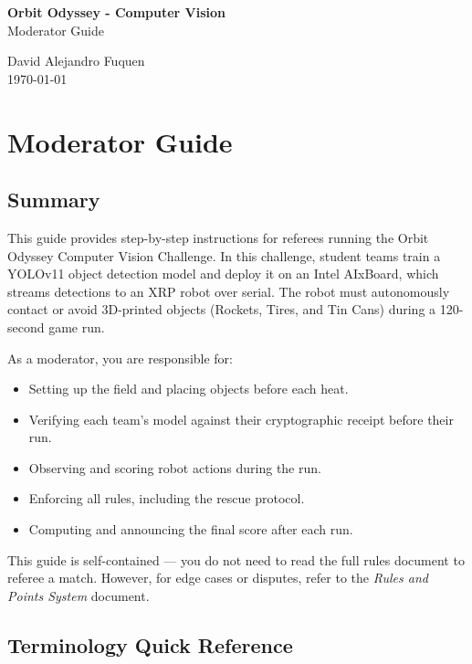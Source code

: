 \documentclass[a4]{article}
\begin{document}
    
    \thispagestyle{fancy}
    
    \begin{center}
        \textbf{\large Orbit Odyssey - Computer Vision} \\
        {Moderator Guide}
        
        \vspace{0.7em}
    
        David Alejandro Fuquen \\
    
        {\small \today}
    
    \end{center}
    
\section*{Moderator Guide}

\subsection*{Summary}

This guide provides step-by-step instructions for referees running the Orbit Odyssey Computer Vision Challenge. In this challenge, student teams train a YOLOv11 object detection model and deploy it on an Intel AIxBoard, which streams detections to an XRP robot over serial. The robot must autonomously contact or avoid 3D-printed objects (Rockets, Tires, and Tin Cans) during a 120-second game run.

As a moderator, you are responsible for:
\begin{itemize}
    \item Setting up the field and placing objects before each heat.
    \item Verifying each team's model against their cryptographic receipt before their run.
    \item Observing and scoring robot actions during the run.
    \item Enforcing all rules, including the rescue protocol.
    \item Computing and announcing the final score after each run.
\end{itemize}

This guide is self-contained --- you do not need to read the full rules document to referee a match. However, for edge cases or disputes, refer to the \textit{Rules and Points System} document.

\subsection*{Terminology Quick Reference}
\end{document}
